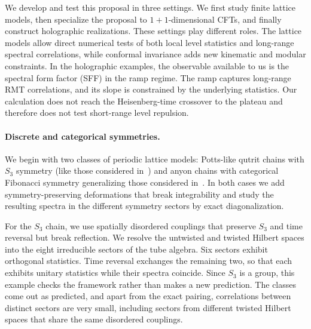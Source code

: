 \documentclass[11pt]{article}
\numberwithin{equation}{section}
\begin{document}
We develop and test this proposal in three settings. We first study finite lattice models, then specialize the proposal to $1+1$-dimensional CFTs, and finally construct holographic realizations. These settings play different roles. The lattice models allow direct numerical tests of both local level statistics and long-range spectral correlations, while conformal invariance adds new kinematic and modular constraints. In the holographic examples, the observable available to us is the spectral form factor (SFF) in the ramp regime. The ramp captures long-range RMT correlations, and its slope is constrained by the underlying statistics. Our calculation does not reach the Heisenberg-time crossover to the plateau and therefore does not test short-range level repulsion.

\vspace{-.2cm}
\paragraph{Discrete and categorical symmetries.}

We begin with two classes of periodic lattice models: Potts-like qutrit chains with $S_3$ symmetry (like those considered in~\cite{Sinha:2025jhh}) and anyon chains with categorical Fibonacci symmetry generalizing those considered in~\cite{Feiguin:2006ydp,Chandran:2016vow}. In both cases we add symmetry-preserving deformations that break integrability and study the resulting spectra in the different symmetry sectors by exact diagonalization.

For the $S_3$ chain, we use spatially disordered couplings that preserve $S_3$ and time reversal but break reflection. We resolve the untwisted and twisted Hilbert spaces into the eight irreducible sectors of the tube algebra. Six sectors exhibit orthogonal statistics. Time reversal exchanges the remaining two, so that each exhibits unitary statistics while their spectra coincide. Since $S_3$ is a group, this example checks the framework rather than makes a new prediction. The classes come out as predicted, and apart from the exact pairing, correlations between distinct sectors are very small, including sectors from different twisted Hilbert spaces that share the same disordered couplings.
\end{document}
